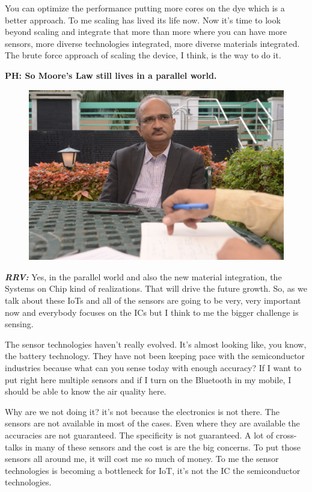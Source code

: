 \begin{multicols}{2}
You can optimize the performance putting more cores on the dye which is a better approach. To me scaling has lived its life now. Now it’s time to look beyond scaling and integrate that more than more where you can have more sensors, more diverse technologies integrated, more diverse materials integrated. The brute force approach of scaling the device, I think, is the way to do it.

\textbf{PH: So Moore’s Law still lives in a parallel world.} 

\begin{figure}[H]
\centering
\includegraphics[scale=.59]{src/Figures/interview/interview-fig12.jpg}
\vspace{-.5cm}
\end{figure}

\textbf{\textit{RRV:}} Yes, in the parallel world and also the new material integration, the Systems on Chip kind of realizations. That will drive the future growth. So, as we talk about these IoTs and all of the sensors are going to be very, very important now and everybody focuses on the ICs but I think to me the bigger challenge is sensing.

The sensor technologies haven’t really evolved. It’s almost looking like, you know, the battery technology. They have not been keeping pace with the semiconductor industries because what can you sense today with enough accuracy? If I want to put right here multiple sensors and if I turn on the Bluetooth in my mobile, I should be able to know the air quality here.

Why are we not doing it? it’s not because the electronics is not there. The sensors are not available in most of the cases. Even where they are available the accuracies are not guaranteed. The specificity is not guaranteed. A lot of cross-talks in many of these sensors and the cost is are the big concerns. To put those sensors all around me, it will cost me so much of money. To me the sensor technologies is becoming a bottleneck for IoT, it’s not the IC the semiconductor technologies.


\end{multicols}
